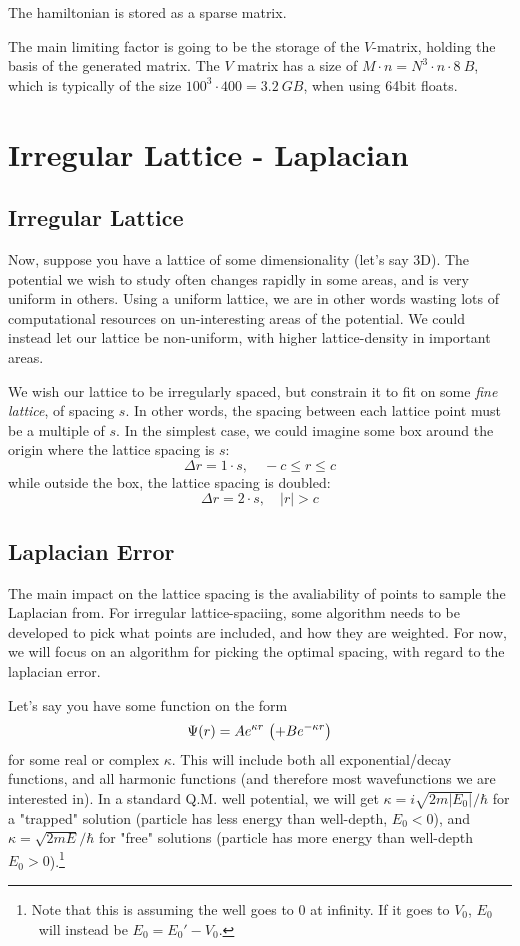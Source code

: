 \documentclass[12p,a4paper]{article}
\renewcommand{\exp}{e^}
\renewcommand{\exp}{e^}
\begin{document}
The hamiltonian is stored as a sparse matrix. 

The main limiting factor is going to be the storage of the $V$-matrix, holding the basis of the generated matrix. The $V$ matrix has a size of $M\cdot n = N^3\cdot n\cdot \SI{8}{B}$, which is typically of the size $100^3\cdot 400 = \SI{3.2}{GB}$, when using 64bit floats.






\newpage
\section{Irregular Lattice - Laplacian}

\subsection{Irregular Lattice}
Now, suppose you have a lattice of some dimensionality (let's say 3D). The potential we wish to study often changes rapidly in some areas, and is very uniform in others. Using a uniform lattice, we are in other words wasting lots of computational resources on un-interesting areas of the potential. We could instead let our lattice be non-uniform, with higher lattice-density in important areas.

We wish our lattice to be irregularly spaced, but constrain it to fit on some \textit{fine lattice}, of spacing $s$. In other words, the spacing between each lattice point must be a multiple of $s$. In the simplest case, we could imagine some box around the origin where the lattice spacing is $s$:
\[
    \Delta r = 1\cdot s, \quad -c \leq r \leq c
\]
while outside the box, the lattice spacing is doubled:
\[
    \Delta r = 2\cdot s, \quad |r| > c
\]


\subsection{Laplacian Error}
The main impact on the lattice spacing is the avaliability of points to sample the Laplacian from. For irregular lattice-spaciing, some algorithm needs to be developed to pick what points are included, and how they are weighted. For now, we will focus on an algorithm for picking the optimal spacing, with regard to the laplacian error.

Let's say you have some function on the form
\begin{align}\label{eqn:Psi1}
    \Psi(r) = A\exp{\kappa r}\ \qty(+ B\exp{-\kappa r})
\end{align}
for some real or complex $\kappa$. This will include both all exponential/decay functions, and all harmonic functions (and therefore most wavefunctions we are interested in). In a standard Q.M. well potential, we will get $\kappa = i\sqrt{2m|E_0|}/\hbar$ for a "trapped" solution (particle has less energy than well-depth, $E_0 < 0$), and $\kappa = \sqrt{2mE}/\hbar$ for "free" solutions (particle has more energy than well-depth $E_0 > 0$).\footnote{Note that this is assuming the well goes to 0 at infinity. If it goes to $V_0$, $E_0$ will instead be $E_0 = E_0' - V_0$.}
\end{document}

